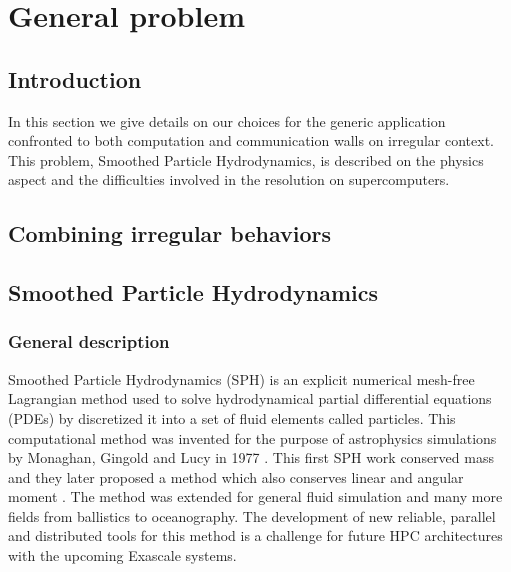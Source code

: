 \chapter{General problem}

\section{Introduction}
In this section we give details on our choices for the generic application confronted to both computation and communication walls on irregular context. 
This problem, Smoothed Particle Hydrodynamics, is described on the physics aspect and the difficulties involved in the resolution on supercomputers.  

\section{Combining irregular behaviors}


\section{Smoothed Particle Hydrodynamics}

\subsection{General description}
Smoothed Particle Hydrodynamics (SPH) is an explicit numerical mesh-free Lagrangian method used to solve hydrodynamical partial differential equations (PDEs) by discretized it into a set of fluid elements called particles. 
This computational method was invented for the purpose of astrophysics simulations by Monaghan, Gingold and Lucy in 1977 \cite{lucy1977numerical,gingold1977smoothed}. 
This first SPH work conserved mass and they later proposed a method which also conserves linear and angular moment \cite{gingold1982kernel}. 
The method was extended for general fluid simulation and many more fields from ballistics to oceanography. 
The development of new reliable, parallel and distributed tools for this method is a challenge for future HPC architectures with the upcoming Exascale systems.

